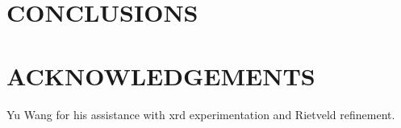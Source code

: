 \documentclass[draft,a4paper,12pt,oneside]{article}%
\begin{document}

\section{CONCLUSIONS}


\section{ACKNOWLEDGEMENTS}

Yu Wang for his assistance with \acrshort{xrd} experimentation and Rietveld refinement. 





\end{document}
